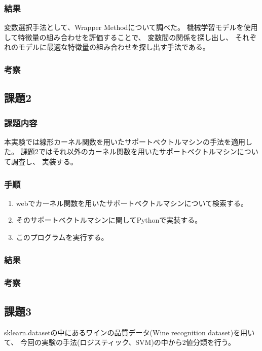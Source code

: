 \documentclass[12pt]{jarticle}
\begin{document}
\subsubsection*{結果}

変数選択手法として、Wrapper Methodについて調べた。
機械学習モデルを使用して特徴量の組み合わせを評価することで、
変数間の関係を探し出し、
それぞれのモデルに最適な特徴量の組み合わせを探し出す手法である。

\subsubsection*{考察}

\clearpage
\subsection{課題2}
\subsubsection*{課題内容}

本実験では線形カーネル関数を用いたサポートベクトルマシンの手法を適用した。
課題2ではそれ以外のカーネル関数を用いたサポートベクトルマシンについて調査し、
実装する。

\subsubsection*{手順}
\begin{enumerate}
    \item webでカーネル関数を用いたサポートベクトルマシンについて検索する。
    \item そのサポートベクトルマシンに関してPythonで実装する。
    \item このプログラムを実行する。
\end{enumerate}

\subsubsection*{結果}
\subsubsection*{考察}
\subsection{課題3}
sklearn.datasetの中にあるワインの品質データ(Wine recognition dataset)を用いて、
今回の実験の手法(ロジスティック、SVM)の中から2値分類を行う。
\end{document}
